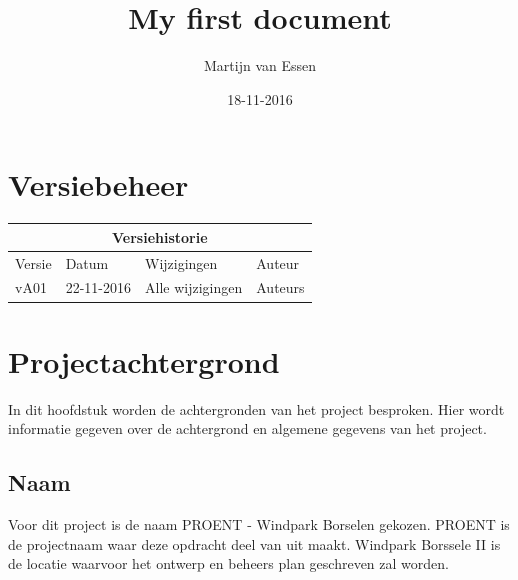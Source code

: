 \documentclass[numbers=endperiod]{scrartcl}
\title{My first document}
\date{18-11-2016}
\author{Martijn van Essen}
\begin{document}
	
	\newpage
	
	\setcounter{secnumdepth}{0} %
	\section{Versiebeheer}
	
	\begin{center}
		\begin{tabular}{| p{4cm} | l | p{7cm} | l |}
			\hline
			
			\multicolumn{4}{|c|}{
				\cellcolor{hhs_theme_heading_2}
				Versiehistorie
			}  \\ \hline
			
			Versie 	& Datum 		& Wijzigingen 	& Auteur \\ \hline
			vA01 	& 22-11-2016 	& Alle wijzigingen 
			&Auteurs\\ \hline
		\end{tabular}
	\end{center}
	\newpage
	
	\renewcommand{\contentsname}{Inhoudsopgave} %
	\setcounter{tocdepth}{2}%
	\tableofcontents
	\newpage
	
	\setcounter{secnumdepth}{3}%

	\section{Projectachtergrond}
	In dit hoofdstuk worden de achtergronden van het project besproken. Hier wordt informatie gegeven over de achtergrond en algemene gegevens van het project.
	
	\subsection{Naam}
	Voor dit project is de naam PROENT - Windpark Borselen gekozen. PROENT is de projectnaam waar deze opdracht deel van uit maakt. Windpark Borssele II is de locatie waarvoor het ontwerp en beheers plan geschreven zal worden.
\end{document}
